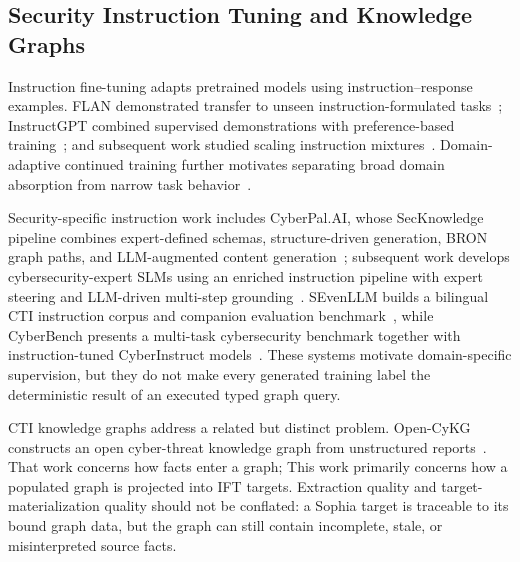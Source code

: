 \documentclass[conference]{IEEEtran}
\begin{document}
\subsection{Security Instruction Tuning and Knowledge Graphs}
Instruction fine-tuning adapts pretrained models using instruction--response examples. FLAN demonstrated transfer to unseen instruction-formulated tasks~\cite{wei2022flan}; InstructGPT combined supervised demonstrations with preference-based training~\cite{ouyang2022training}; and subsequent work studied scaling instruction mixtures~\cite{chung2024scaling}. Domain-adaptive continued training further motivates separating broad domain absorption from narrow task behavior~\cite{gururangan2020dont}.

Security-specific instruction work includes CyberPal.AI, whose SecKnowledge pipeline combines expert-defined schemas, structure-driven generation, BRON graph paths, and LLM-augmented content generation~\cite{levi2025cyberpal}; subsequent work develops cybersecurity-expert SLMs using an enriched instruction pipeline with expert steering and LLM-driven multi-step grounding~\cite{levi2025slm}. SEvenLLM builds a bilingual CTI instruction corpus and companion evaluation benchmark~\cite{ji2024sevenllm}, while CyberBench presents a multi-task cybersecurity benchmark together with instruction-tuned CyberInstruct models~\cite{liu2024cyberbench}. These systems motivate domain-specific supervision, but they do not make every generated training label the deterministic result of an executed typed graph query.

CTI knowledge graphs address a related but distinct problem. Open-CyKG constructs an open cyber-threat knowledge graph from unstructured reports~\cite{sarhan2021opencykg}. That work concerns how facts enter a graph; This work primarily concerns how a populated graph is projected into IFT targets. Extraction quality and target-materialization quality should not be conflated: a Sophia target is traceable to its bound graph data, but the graph can still contain incomplete, stale, or misinterpreted source facts.
\end{document}
